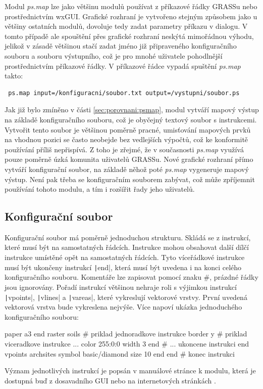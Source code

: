 \documentclass[a4paper,12pt,draft]{article}
\newcommand{\modul}[1]{\emph{#1}}
\newcommand{\instr}[1]{\lstinline[style=psmapInline]{#1}}
\begin{document}
Modul \modul{ps.map} lze jako většinu modulů používat z příkazové řádky GRASSu nebo pro\-střed\-nic\-tvím wxGUI. Grafické rozhraní je vytvořeno stejným způsobem jako u většiny ostatních modulů, dovoluje tedy zadat parametry příkazu v dialogu. V tomto případě ale spouštění přes grafické rozhraní neskýtá mimořádnou výhodu, jelikož v zásadě většinou stačí zadat jméno již připraveného konfiguračního souboru a souboru výstupního, což je pro mnohé uživatele pohodlnější prostřednictvím příkazové řádky. V příkazové řádce vypadá spuštění \modul{ps.map} takto:
\begin{verbatim}
 ps.map input=/konfiguracni/soubor.txt output=/vystupni/soubor.ps   
\end{verbatim}

Jak již bylo zmíněno v části \ref{sec:porovnani:psmap}, modul vytváří mapový výstup na základě konfiguračního souboru, což je obyčejný textový soubor s instrukcemi. Vytvořit tento soubor je většinou poměrně pracné, umisťování mapových prvků na vhodnou pozici se často neobejde bez vedlejších výpočtů, což ke konformitě používání příliš nepřispívá. Z toho je zřejmé, že v současnosti \modul{ps.map} využívá pouze poměrně úzká komunita uživatelů GRASSu. Nové grafické rozhraní přímo vytváří konfigurační soubor, na základě něhož poté \modul{ps.map} vygeneruje mapový výstup. Není pak třeba se konfiguračním souborem zabývat, což může zpříjemnit používání tohoto modulu, a tím i rozšířit řady jeho uživatelů. 

\subsection{Konfigurační soubor}
Konfigurační soubor má poměrně jednoduchou strukturu. Skládá se z instrukcí, které musí být na samostatných řádcích. Instrukce mohou obsahovat další dílčí instrukce umístěné opět na samostatných řádcích. Tyto víceřádkové instrukce musí být ukončeny  instrukcí \instr|end|, která musí být uvedena i na konci celého konfiguračního souboru. Komentáře lze zapisovat pomocí znaku \#, prázdné řádky jsou ignorovány. Pořadí instrukcí většinou nehraje roli s výjimkou instrukcí \instr|vpoints|, \instr|vlines| a \instr|vareas|, které vykreslují vektorové vrstvy. První uvedená vektorová vrstva bude vykreslena nejvýše. Více napoví ukázka jednoduchého konfiguračního souboru:
\begin{psmap}
paper a3
end
raster soils            # priklad jednoradkove instrukce
border y                # priklad viceradkove instrukce ...
   color 255:0:0
   width 3
end                     # ... ukoncene instrukci end
vpoints archsites
   symbol basic/diamond
   size 10
end
end                     # konec instrukci
\end{psmap}
Význam jednotlivých instrukcí je popsán v manuálové stránce k modulu, která je dostupná buď z dosavadního GUI nebo na internetových stránkách \cite{manual}.
\end{document}
